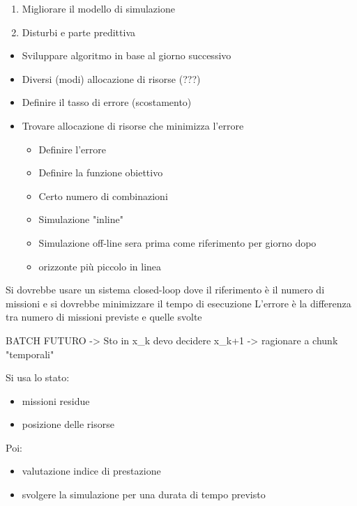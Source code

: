 \begin{enumerate}
	\item Migliorare il modello di simulazione
	\item Disturbi e parte predittiva
\end{enumerate}

\begin{itemize}
	\item Sviluppare algoritmo in base al giorno successivo 
	\item Diversi (modi) allocazione di risorse (???)
	\item Definire il tasso di errore (scostamento)
	\item Trovare allocazione di risorse che minimizza l'errore
	\begin{itemize}
		\item Definire l'errore
		\item Definire la funzione obiettivo
		\item Certo numero di combinazioni
		\item Simulazione "inline"
		\item Simulazione off-line sera prima come riferimento per giorno dopo
		\item orizzonte più piccolo in linea
	\end{itemize}
\end{itemize}

Si dovrebbe usare un sistema closed-loop dove il riferimento è il numero
di missioni e si dovrebbe minimizzare il tempo di esecuzione
L'errore è la differenza tra numero di missioni previste e quelle svolte\newline


\noindent BATCH FUTURO -> Sto in x\_k devo decidere x\_k+1 -> ragionare a chunk "temporali"\newline

\noindent Si usa lo stato:
\begin{itemize}
	\item missioni residue
	\item posizione delle risorse
\end{itemize}

\noindent Poi:
\begin{itemize}
	\item valutazione indice di prestazione
	\item svolgere la simulazione per una durata di tempo previsto
\end{itemize}


